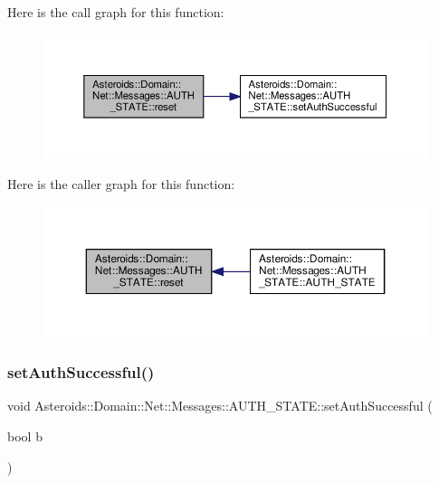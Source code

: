 Here is the call graph for this function\+:\nopagebreak
\begin{figure}[H]
\begin{center}
\leavevmode
\includegraphics[width=350pt]{classAsteroids_1_1Domain_1_1Net_1_1Messages_1_1AUTH__STATE_a87117d1188c07bea42ec44ed45125044_cgraph}
\end{center}
\end{figure}
Here is the caller graph for this function\+:\nopagebreak
\begin{figure}[H]
\begin{center}
\leavevmode
\includegraphics[width=350pt]{classAsteroids_1_1Domain_1_1Net_1_1Messages_1_1AUTH__STATE_a87117d1188c07bea42ec44ed45125044_icgraph}
\end{center}
\end{figure}
\mbox{\label{classAsteroids_1_1Domain_1_1Net_1_1Messages_1_1AUTH__STATE_a7f307b3e98dee115df05cc6d574ed2d0}} 
\subsubsection{\texorpdfstring{set\+Auth\+Successful()}{setAuthSuccessful()}}
{\footnotesize\ttfamily void Asteroids\+::\+Domain\+::\+Net\+::\+Messages\+::\+A\+U\+T\+H\+\_\+\+S\+T\+A\+T\+E\+::set\+Auth\+Successful (\begin{DoxyParamCaption}\item[{bool}]{b }\end{DoxyParamCaption})}



